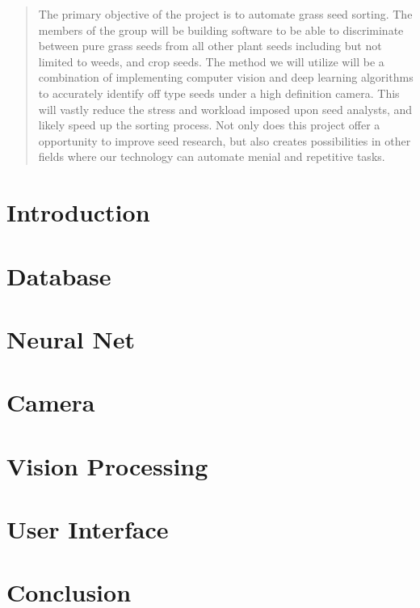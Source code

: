 \documentclass[onecolumn, draftclsnofoot,10pt, compsoc]{IEEEtran}
\begin{document}
\begin{titlepage}
\begin{singlespace}
\begin{abstract}
        	The primary objective of the project is to automate grass seed sorting. The members of the group will be building software to be able to discriminate between pure grass seeds from all other plant seeds including but not limited to weeds, and crop seeds. The method we will utilize will be a combination of implementing computer vision and deep learning algorithms to accurately identify off type seeds under a high definition camera. This will vastly reduce the stress and workload imposed upon seed analysts, and likely speed up the sorting process. Not only does this project offer a opportunity to improve seed research, but also creates possibilities in other fields where our technology can automate menial and repetitive tasks.
        \end{abstract}     
    \end{singlespace}
\end{titlepage}
\newpage
{}
\tableofcontents
\clearpage

\section{Introduction}







\section{Database}



\section{Neural Net}



\section{Camera}



\section{Vision Processing}



\section{User Interface}




\section{Conclusion}


\end{document}
